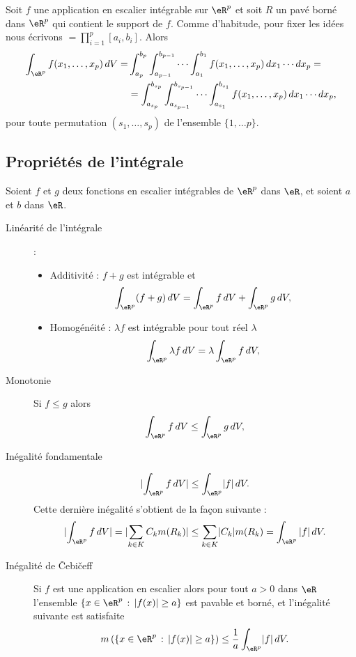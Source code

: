 \begin{proposition}
 Soit $f$ une application en escalier intégrable sur $\eR^p$ et soit $R$ un pavé borné dans $\eR^p$ qui contient le support de $f$. Comme d'habitude, pour fixer les idées nous écrivons $=\prod_{i=1}^p[a_i,b_i]$. Alors
 \begin{equation}
   \begin{aligned}
     \int_{\eR^p}f(x_1,\ldots, x_p) \, dV =& \int_{a_p}^{b_p}\int_{a_{p-1}}^{b_{p-1}}\cdots\int_{a_1}^{b_1} f(x_1,\ldots, x_p) \, dx_1\cdots dx_p=\\
&=\int_{a_{s_p}}^{b_{s_p}}\int_{a_{s_{p-1}}}^{b_{s_{p-1}}}\cdots\int_{a_{s_1}}^{b_{s_1}} f(x_1,\ldots, x_p) \, dx_1\cdots dx_p,
   \end{aligned}
 \end{equation}
pour toute permutation $(s_1,\ldots,s_p)$ de l'ensemble $\{1,\ldots p\}$.
\end{proposition}
\subsection{Propriétés de l'intégrale}
Soient $f$ et $g$ deux fonctions en escalier intégrables de $\eR^p$ dans $\eR$, et soient $a$ et $b$ dans $\eR$. 
\begin{description}
\item[Linéarité de l'intégrale] : 
  \begin{itemize}
  \item Additivité : $f+g$ est intégrable et 
\[
\int_{\eR^p} (f+g)\, dV = \int_{\eR^p} f\, dV+ \int_{\eR^p} g\, dV,
\]
\item Homogénéité : $\lambda f$ est intégrable pour tout réel $\lambda$ 
\[
\int_{\eR^p} \lambda  f\, dV = \lambda\int_{\eR^p} f\, dV,
\]
  \end{itemize}
\item[Monotonie] Si $f\leq g$ alors 
\[
 \int_{\eR^p} f\, dV\leq \int_{\eR^p} g\, dV,
\]
\item[Inégalité fondamentale]
  \[
\lvert \int_{\eR^p}f\,dV\rvert \leq\int_{\eR^p}\lvert f\rvert\,dV.
\] 
Cette dernière inégalité s'obtient de la façon suivante :
\[
\lvert\int_{\eR^p}f\,dV\rvert =\lvert \sum_{k\in K} C_k m(R_k)\rvert \leq\sum_{k\in K}\lvert C_k\rvert m(R_k)=\int_{\eR^p}|f|\,dV.
\] 
\item[Inégalité de Čebičeff]  Si $f$ est une application en escalier alors pour tout $a>0$ dans $\eR$ l'ensemble $\{x\in\eR^p\,:\, |f(x)|\geq a\}$ est pavable et borné, et l'inégalité suivante est satisfaite
\[
m\left(\{x\in\eR^p\,:\, |f(x)|\geq a\}\right)\leq \frac{1}{a} \int_{\eR^p}\lvert f\rvert\,dV.
\]
\end{description}

